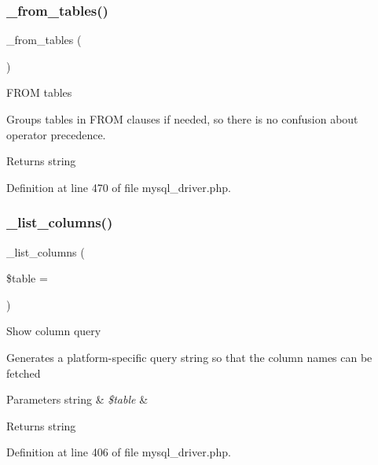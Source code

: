 \subsubsection{\texorpdfstring{\_from\_tables()}{\_from\_tables()}}
{\footnotesize\ttfamily \+\_\+from\+\_\+tables (\begin{DoxyParamCaption}{ }\end{DoxyParamCaption})\hspace{0.3cm}{\ttfamily [protected]}}

F\+R\+OM tables

Groups tables in F\+R\+OM clauses if needed, so there is no confusion about operator precedence.

\begin{DoxyReturn}{Returns}
string 
\end{DoxyReturn}


Definition at line 470 of file mysql\+\_\+driver.\+php.

\mbox{\label{class_c_i___d_b__mysql__driver_a7ccb7f9c301fe7f0a9db701254142b63}} 
\subsubsection{\texorpdfstring{\_list\_columns()}{\_list\_columns()}}
{\footnotesize\ttfamily \+\_\+list\+\_\+columns (\begin{DoxyParamCaption}\item[{}]{\$table = {\ttfamily \textquotesingle{}\textquotesingle{}} }\end{DoxyParamCaption})\hspace{0.3cm}{\ttfamily [protected]}}

Show column query

Generates a platform-\/specific query string so that the column names can be fetched


\begin{DoxyParams}[1]{Parameters}
string & {\em \$table} & \\
\hline
\end{DoxyParams}
\begin{DoxyReturn}{Returns}
string 
\end{DoxyReturn}


Definition at line 406 of file mysql\+\_\+driver.\+php.

